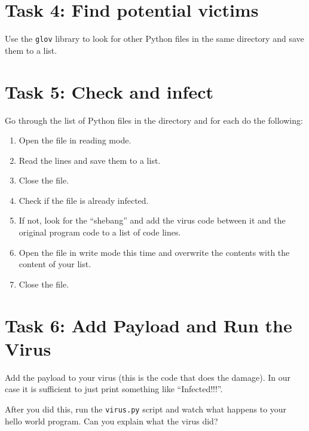 \documentclass{article}
\begin{document}
\section{Task 4: Find potential victims}
Use the \texttt{glov} library to look for other Python files in the same directory and save them to a list.

\section{Task 5: Check and infect}
Go through the list of Python files in the directory and for each do the following:
\begin{enumerate}
\item Open the file in reading mode.
\item Read the lines and save them to a list.
\item Close the file.
\item Check if the file is already infected.
\item If not, look for the ``shebang'' and add the virus code between it and the original program code to a list of code lines.
\item Open the file in write mode this time and overwrite the contents with the content of your list.
\item Close the file.
\end{enumerate}

\section{Task 6: Add Payload and Run the Virus}
Add the payload to your virus (this is the code that does the damage). In our case it is sufficient to just print something like ``Infected!!!''.

After you did this, run the \texttt{virus.py} script and watch what happens to your hello world program. Can you explain what the virus did?
\end{document}
